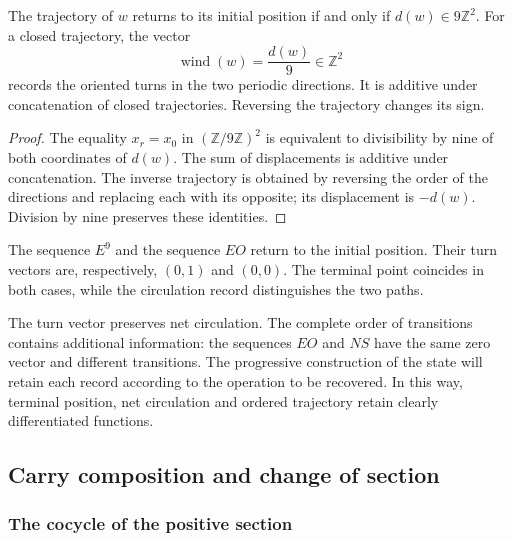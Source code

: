 \begin{bloqueindivisible}
\begin{teorema}
\label{thm:app-transporte}
The trajectory of $w$ returns to its initial position if and only if $d(w)\in9\mathbb Z^2$. For a closed trajectory, the vector
\begin{equation}
 \operatorname{wind}(w)=\frac{d(w)}9\in\mathbb Z^2
\end{equation}
records the oriented turns in the two periodic directions. It is additive under concatenation of closed trajectories. Reversing the trajectory changes its sign.
\end{teorema}

\begin{proof}
The equality $x_r=x_0$ in $(\mathbb Z/9\mathbb Z)^2$ is equivalent to divisibility by nine of both coordinates of $d(w)$. The sum of displacements is additive under concatenation. The inverse trajectory is obtained by reversing the order of the directions and replacing each with its opposite; its displacement is $-d(w)$. Division by nine preserves these identities.
\end{proof}
\end{bloqueindivisible}

\begin{ejemplo}
The sequence $E^9$ and the sequence $EO$ return to the initial position. Their turn vectors are, respectively, $(0,1)$ and $(0,0)$. The terminal point coincides in both cases, while the circulation record distinguishes the two paths.
\end{ejemplo}

The turn vector preserves net circulation. The complete order of transitions contains additional information: the sequences $EO$ and $NS$ have the same zero vector and different transitions. The progressive construction of the state will retain each record according to the operation to be recovered. In this way, terminal position, net circulation and ordered trajectory retain clearly differentiated functions.

\subsection{Carry composition and change of section}
\label{sec:app-cociclo}

\subsubsection{The cocycle of the positive section}

